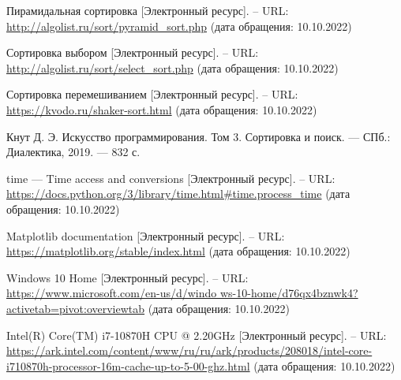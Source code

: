 
\renewcommand\bibname{Список использованных источников}
\begin{thebibliography}{}
  Пирамидальная сортировка [Электронный ресурс]. -- URL: \url{http://algolist.ru/sort/pyramid_sort.php} (дата обращения: 10.10.2022)

 Сортировка выбором [Электронный ресурс]. -- URL: \url{http://algolist.ru/sort/select_sort.php} (дата обращения: 10.10.2022)

 Сортировка перемешиванием [Электронный ресурс]. -- URL: \url{https://kvodo.ru/shaker-sort.html} (дата обращения: 10.10.2022)

 Кнут Д. Э. Искусство программирования. Том 3. Сортировка и поиск. --- СПб.: Диалектика, 2019. --- 832 с.

 time — Time access and conversions [Электронный ресурс]. -- URL: \url{https://docs.python.org/3/library/time.html#time.process_time} (дата обращения: 10.10.2022)

 Matplotlib documentation [Электронный ресурс]. -- URL: \url{https://matplotlib.org/stable/index.html} (дата обращения: 10.10.2022)

 Windows 10 Home [Электронный ресурс]. -- URL: \url{https://www.microsoft.com/en-us/d/windo ws-10-home/d76qx4bznwk4?activetab=pivot:overviewtab} (дата обращения: 10.10.2022)

 Intel(R) Core(TM) i7-10870H CPU @ 2.20GHz [Электронный ресурс]. -- URL: \url{https://ark.intel.com/content/www/ru/ru/ark/products/208018/intel-core-i710870h-processor-16m-cache-up-to-5-00-ghz.html} (дата обращения: 10.10.2022)

\end{thebibliography}